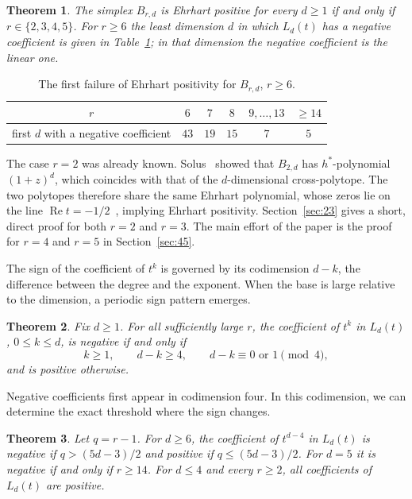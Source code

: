 \documentclass[11pt]{amsart}
\newtheorem{theorem}{Theorem}[section]
\theoremstyle{remark}
\begin{document}
\begin{theorem}\label{thm:classification}
The simplex $B_{r,d}$ is Ehrhart positive for every $d\ge1$ if and only if
$r\in\{2,3,4,5\}$. For $r\ge6$ the least dimension $d$ in which $L_d(t)$ has a
negative coefficient is given in Table~\ref{tab:first}; in that dimension the
negative coefficient is the linear one.
\end{theorem}

\begin{table}[ht]
\centering
\begin{tabular}{c|ccccc}
\toprule
$r$ & $6$ & $7$ & $8$ & $9,\ldots,13$ & $\ge14$\\
\midrule
first $d$ with a negative coefficient & $43$ & $19$ & $15$ & $7$ & $5$\\
\bottomrule
\end{tabular}
\caption{The first failure of Ehrhart positivity for $B_{r,d}$, $r\ge6$.}
\label{tab:first}
\end{table}

The case $r=2$ was already known. Solus~\cite{Sol} showed that $B_{2,d}$ has
$h^*$-polynomial $(1+z)^d$, which coincides with that of the $d$-dimensional
cross-polytope. The two polytopes therefore share the same Ehrhart polynomial,
whose zeros lie on the line $\operatorname{Re}t=-1/2$~\cite{BCKV}, implying
Ehrhart positivity. Section~\ref{sec:23} gives a short, direct proof for both
$r=2$ and $r=3$. The main effort of the paper is the proof for $r=4$ and $r=5$
in Section~\ref{sec:45}.

The sign of the coefficient of $t^k$ is governed by its codimension $d-k$, the
difference between the degree and the exponent. When the base is large relative
to the dimension, a periodic sign pattern emerges.

\begin{theorem}\label{thm:large}
Fix $d\ge1$. For all sufficiently large $r$, the coefficient of $t^k$ in
$L_d(t)$, $0\le k\le d$, is negative if and only if
\[
 k\ge1,\qquad d-k\ge4,\qquad d-k\equiv0\text{ or }1\pmod4,
\]
and is positive otherwise.
\end{theorem}

Negative coefficients first appear in codimension four. In this codimension, we
can determine the exact threshold where the sign changes.

\begin{theorem}\label{thm:codim4}
Let $q=r-1$. For $d\ge6$, the coefficient of $t^{d-4}$ in $L_d(t)$ is negative
if $q>(5d-3)/2$ and positive if $q\le(5d-3)/2$. For $d=5$ it is negative if and
only if $r\ge14$. For $d\le4$ and every $r\ge2$, all coefficients of $L_d(t)$
are positive.
\end{theorem}
\end{document}
